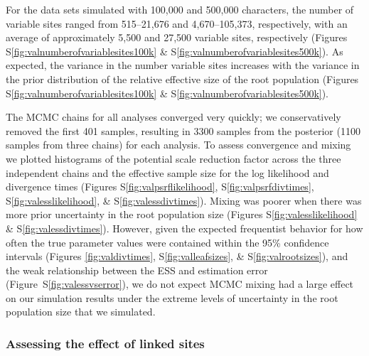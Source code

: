 For the data sets simulated with 100,000 and 500,000 characters,
the number of variable sites ranged from
515--21,676 
and
4,670--105,373,
respectively, with an average of approximately
5,500
and 
27,500 variable sites, respectively
(Figures S\ref{fig:valnumberofvariablesites100k} \&
S\ref{fig:valnumberofvariablesites500k}).
As expected, the variance in the number variable sites increases with the
variance in the prior distribution of the relative effective size of the root
population
(Figures S\ref{fig:valnumberofvariablesites100k} \&
S\ref{fig:valnumberofvariablesites500k}).

The MCMC chains for all analyses converged very quickly;
we conservatively removed the first 401 samples, resulting in 3300 samples from
the posterior (1100 samples from three chains) for each analysis.
To assess convergence and mixing we plotted histograms of the potential scale
reduction factor across the three independent chains and the effective sample
size for the log likelihood and divergence times
(Figures S\ref{fig:valpsrflikelihood}, S\ref{fig:valpsrfdivtimes},
S\ref{fig:valesslikelihood}, \& S\ref{fig:valessdivtimes}).
Mixing was poorer when there was more prior uncertainty in the root population
size
(Figures S\ref{fig:valesslikelihood} \& S\ref{fig:valessdivtimes}).
However, given the expected frequentist behavior for how often the true
parameter values were contained within the 95\% confidence intervals (Figures
\ref{fig:valdivtimes}, S\ref{fig:valleafsizes}, \& S\ref{fig:valrootsizes}),
and the weak relationship between the ESS and estimation error
(Figure~S\ref{fig:valessvserror}),
we do not expect MCMC mixing had a large effect on our simulation results under
the extreme levels of uncertainty in the root population size that we
simulated.



\subsubsection{Assessing the effect of linked sites}

